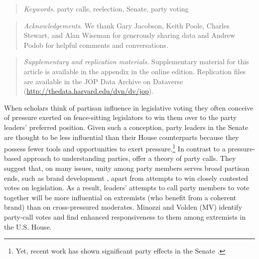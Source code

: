 \documentclass[12pt]{article}
\begin{document}
\begin{abstract}
\noindent \textit{Keywords.}
party calls, reelection, Senate, party voting
\end{abstract}


\begin{abstract}
\noindent \textit{Acknowledgements.}
We thank Gary Jacobson, Keith Poole, Charles Stewart,
and Alan Wiseman for generously sharing data
and Andrew Podob for helpful comments and conversations.
\end{abstract}


\begin{abstract}
\noindent \textit{Supplementary and replication materials.}
Supplementary material for this article is available in the appendix
in the online edition.
Replication files are available in the JOP Data Archive on Dataverse
(\href{http://thedata.harvard.edu/dvn/dv/jop}{http://thedata.harvard.edu/dvn/dv/jop}).
\end{abstract}


\clearpage



\doublespacing

\noindent When scholars think of partisan influence in legislative voting they
often conceive of pressure exerted on fence-sitting legislators to win them over
to the party leaders' preferred position.
Given such a conception, party leaders in the Senate are thought to be less
influential than their House counterparts because they possess fewer tools and
opportunities to exert pressure.\footnote{
  \doublespacing\normalsize
  Yet, recent work has shown significant party effects in the Senate
  \citep[e.g.,][]{Gailmard:2007, Monroe:2008, Patty:2008, Volden:2006}.}
In contrast to a pressure-based approach to understanding parties,
\cite{Minozzi:2013} offer a theory of party calls.
They suggest that, on many issues, unity among party members serves broad
partisan ends, such as brand development \citep[e.g.,][]{Snyder:2002}, apart
from attempts to win closely contested votes on legislation.
As a result, leaders' attempts to call party members to vote together will be
more influential on extremists (who benefit from a coherent brand) than on
cross-pressured moderates.
Minozzi and Volden (MV) identify party-call votes and find enhanced
responsiveness to them among extremists in the U.S. House.
\end{document}
